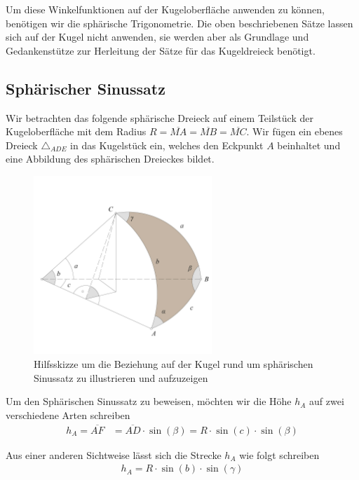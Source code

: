 \begin{refsection}
Um diese Winkelfunktionen auf der Kugeloberfläche anwenden zu können, benötigen wir die sphärische Trigonometrie. Die oben beschriebenen Sätze lassen sich auf der Kugel nicht anwenden, sie werden aber als Grundlage und Gedankenstütze zur Herleitung der Sätze für das Kugeldreieck benötigt.


\subsection{Sphärischer Sinussatz}
Wir betrachten das folgende sphärische Dreieck auf einem Teilstück der Kugeloberfläche mit dem Radius $R= \overline{MA} = \overline{MB} = \overline{MC}$. Wir fügen ein ebenes Dreieck $\triangle_{ADE}$ in das Kugelstück ein, welches den Eckpunkt $A$ beinhaltet und eine Abbildung des sphärischen Dreieckes bildet.

\begin{figure}[hbtp]
\centering
\includegraphics[width=0.6\textwidth]{kugel/Sinussatz.jpg}
\caption{Hilfsskizze um die Beziehung auf der Kugel rund um sphärischen Sinussatz zu illustrieren und aufzuzeigen}
\end{figure}

Um den Sphärischen Sinussatz zu beweisen, möchten wir die Höhe $h_{A}$ auf zwei verschiedene Arten schreiben
\begin{align}
h_{A} = \overline{AF} &= \overline{AD} \cdot \sin(\beta) = R \cdot \sin(c) \cdot \sin(\beta)  
\label {V1}
\end{align}

Aus einer anderen Sichtweise lässt sich die Strecke $h_{A}$ wie folgt schreiben
\begin{align}
h_{A} = R \cdot \sin(b) \cdot \sin(\gamma)  
\label {V2}
\end{align}


\end{refsection}
